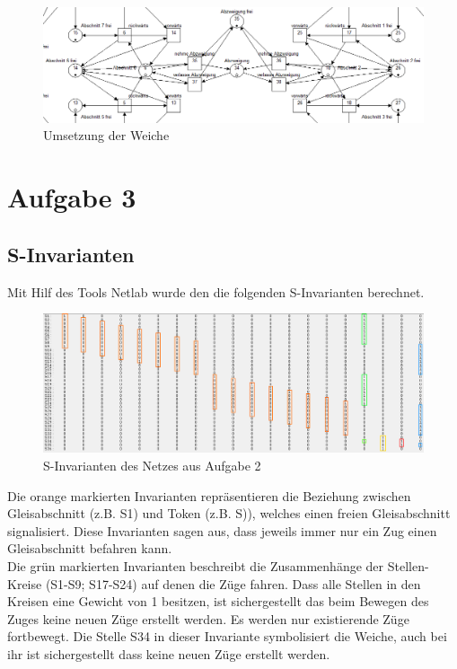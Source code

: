 \documentclass[10pt]{scrartcl}
\begin{document}
\begin{figure}[htbp]
	\centering	\includegraphics[width=1.0\textwidth]{Bilder/Aufgabe2_Weiche.png}
	\caption{Umsetzung der Weiche}
	\label{fig:Weiche}
\end{figure}

\section{Aufgabe 3}

\subsection{S-Invarianten}
Mit Hilf des Tools Netlab wurde den die folgenden S-Invarianten berechnet.

\begin{figure}[htbp]
	\centering	\includegraphics[width=1.0\textwidth]{Bilder/s_invarianten.png}
	\caption{S-Invarianten des Netzes aus Aufgabe 2}
	\label{fig:s_invarianten}
\end{figure}

Die orange markierten Invarianten repräsentieren die Beziehung zwischen Gleisabschnitt (z.B. S1) und Token (z.B. S)), welches einen freien Gleisabschnitt signalisiert.
Diese Invarianten sagen aus, dass jeweils immer nur ein Zug einen Gleisabschnitt befahren kann.\\

Die grün markierten Invarianten beschreibt die Zusammenhänge der Stellen-Kreise (S1-S9; S17-S24) auf denen die Züge fahren.
Dass alle Stellen in den Kreisen eine Gewicht von 1 besitzen, ist sichergestellt das beim Bewegen des Zuges keine neuen Züge erstellt werden.
Es werden nur existierende Züge fortbewegt.
Die Stelle S34 in dieser Invariante symbolisiert die Weiche, auch bei ihr ist sichergestellt dass keine neuen Züge erstellt werden.\\
  
\end{document}
